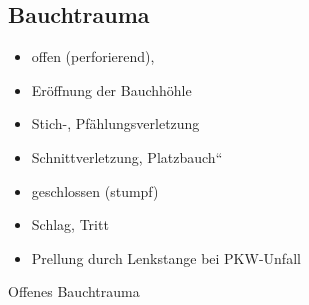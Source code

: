 \documentclass{article}
\begin{document}
\subsection[Bauchtrauma]{Bauchtrauma}
\begin{itemize}
\item offen (perforierend),

\end{itemize}
\begin{itemize}
\item  Er\"offnung der  Bauchh\"ohle

\item Stich-, Pf\"ahlungsverletzung

\item Schnittverletzung, {\quotedblbase}Platzbauch{\textquotedblleft}

\end{itemize}
\begin{itemize}
\item geschlossen (stumpf)

\end{itemize}
\begin{itemize}
\item Schlag, Tritt

\item Prellung durch Lenkstange bei PKW-Unfall

\end{itemize}
Offenes Bauchtrauma
\end{document}
